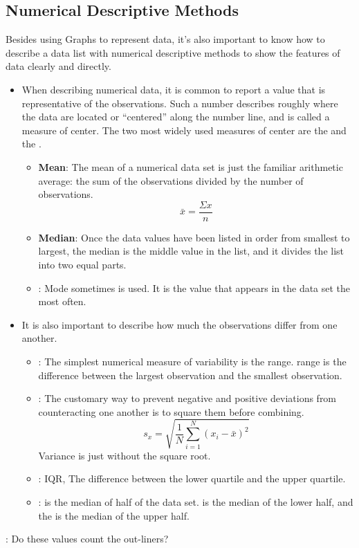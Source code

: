 \subsection{Numerical Descriptive Methods}
Besides using Graphs to represent data, it's also important to know how to describe a data list with numerical descriptive methods to show the features of data clearly and directly.
\begin{itemize}
\item {} When describing numerical data, it is common to report a value that is representative
of the observations. Such a number describes roughly where the data are located or “centered” along the number line, and is called a measure of center. The two most widely used measures of center are the  and the .
\begin{itemize}
    \item \textbf{Mean}: The mean of a numerical data set is just the familiar arithmetic average: the sum of the observations divided by the number of observations.
    \begin{equation}
        \bar x=\frac{\Sigma x}{n}
    \end{equation}
    \item \textbf{Median}: Once the data values have been listed in order from smallest to largest, the median is the middle value in the list, and
it divides the list into two equal parts. 
    \item {}: Mode sometimes is used. It is the value that appears in the data set the most often.
\end{itemize}

\item {}It is also
important to describe how much the observations differ from one another. 
\begin{itemize}
    \item {}: The simplest numerical measure of variability is the range. range is the difference between the largest observation and the smallest observation.
    \item{}: The customary way to prevent negative and positive deviations from counteracting one another is to square them before combining.
    \begin{equation}
        s_x = \sqrt {\frac{1}{N}\sum\limits_{i = 1}^N {\left( {x_i - \bar x} \right)^2 } }
    \end{equation}
    Variance is just without the square root.
    \item{}: IQR, The difference between the lower quartile and the upper quartile.
    \item {}: is the median of half of the data set. is the median of the lower half, and the  is the median of the upper half.
\end{itemize}
\end{itemize}
\begin{Question}:
    Do these values count the out-liners?
\end{Question}
\vfill
\newpage



